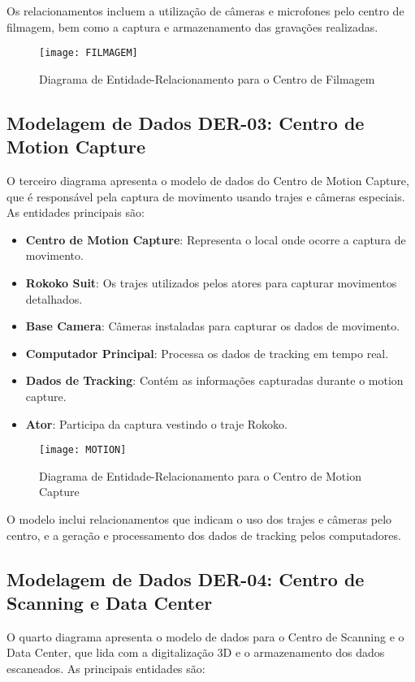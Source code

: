 Os relacionamentos incluem a utilização de câmeras e microfones pelo centro de filmagem, bem como a captura e armazenamento das gravações realizadas.

\begin{figure}[ht]
    \centering
    \texttt{[image: FILMAGEM]}
    \caption{Diagrama de Entidade-Relacionamento para o Centro de Filmagem}
    \label{fig:filmagem}
\end{figure}

\subsection{Modelagem de Dados DER-03: Centro de Motion Capture}
O terceiro diagrama apresenta o modelo de dados do Centro de Motion Capture, que é responsável pela captura de movimento usando trajes e câmeras especiais. As entidades principais são:

\begin{itemize}
    \item \textbf{Centro de Motion Capture}: Representa o local onde ocorre a captura de movimento.
    \item \textbf{Rokoko Suit}: Os trajes utilizados pelos atores para capturar movimentos detalhados.
    \item \textbf{Base Camera}: Câmeras instaladas para capturar os dados de movimento.
    \item \textbf{Computador Principal}: Processa os dados de tracking em tempo real.
    \item \textbf{Dados de Tracking}: Contém as informações capturadas durante o motion capture.
    \item \textbf{Ator}: Participa da captura vestindo o traje Rokoko.
\end{itemize}

\begin{figure}[ht]
    \centering
    \texttt{[image: MOTION]}
    \caption{Diagrama de Entidade-Relacionamento para o Centro de Motion Capture}
    \label{fig:motion}
\end{figure}

O modelo inclui relacionamentos que indicam o uso dos trajes e câmeras pelo centro, e a geração e processamento dos dados de tracking pelos computadores.

\subsection{Modelagem de Dados DER-04: Centro de Scanning e Data Center}
O quarto diagrama apresenta o modelo de dados para o Centro de Scanning e o Data Center, que lida com a digitalização 3D e o armazenamento dos dados escaneados. As principais entidades são:

